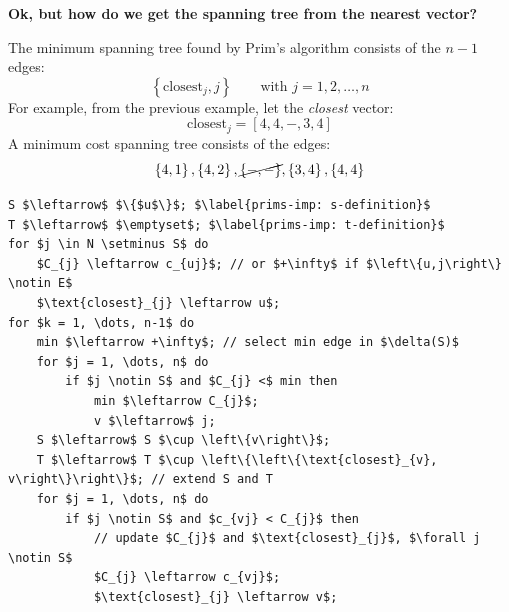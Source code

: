 \noindent
\begin{flushleft}
    \textcolor{Green3}{ \textbf{Ok, but how do we get the spanning tree from the nearest vector?}}
\end{flushleft}
The minimum spanning tree found by Prim's algorithm consists of the $n-1$ edges:
\begin{equation*}
    \left\{\text{closest}_{j}, j\right\} \hspace{2em} \text{with } j = 1,2,\dots,n
\end{equation*}
For example, from the previous example, let the \emph{closest} vector:
\begin{equation*}
    \text{closest}_{j} = \left[4,4,-,3,4\right]
\end{equation*}
A minimum cost spanning tree consists of the edges:
\begin{equation*}
    \left\{4,1\right\}, \left\{4,2\right\}, \cancel{\left\{-,-\right\}}, \left\{3,4\right\}, \left\{4,4\right\}
\end{equation*}
\begin{lstlisting}[language=pseudo-code, caption={Minimum spanning tree (MST) problem: Prim's $O\left(n^{2}\right)$}]
S $\leftarrow$ $\{$u$\}$; $\label{prims-imp: s-definition}$
T $\leftarrow$ $\emptyset$; $\label{prims-imp: t-definition}$
for $j \in N \setminus S$ do
    $C_{j} \leftarrow c_{uj}$; // or $+\infty$ if $\left\{u,j\right\} \notin E$
    $\text{closest}_{j} \leftarrow u$;
for $k = 1, \dots, n-1$ do
    min $\leftarrow +\infty$; // select min edge in $\delta(S)$
    for $j = 1, \dots, n$ do
        if $j \notin S$ and $C_{j} <$ min then
            min $\leftarrow C_{j}$;
            v $\leftarrow$ j;
    S $\leftarrow$ S $\cup \left\{v\right\}$;
    T $\leftarrow$ T $\cup \left\{\left\{\text{closest}_{v}, v\right\}\right\}$; // extend S and T
    for $j = 1, \dots, n$ do
        if $j \notin S$ and $c_{vj} < C_{j}$ then
            // update $C_{j}$ and $\text{closest}_{j}$, $\forall j \notin S$
            $C_{j} \leftarrow c_{vj}$;
            $\text{closest}_{j} \leftarrow v$;
\end{lstlisting}